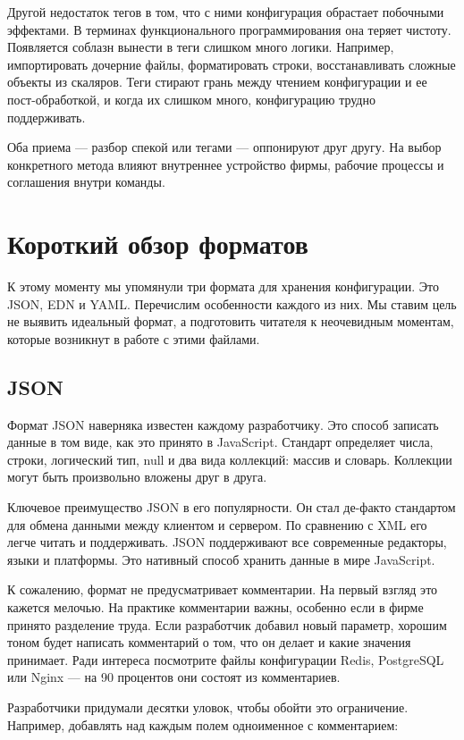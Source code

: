 Другой недостаток тегов в том, что с ними конфигурация обрастает побочными
эффектами. В терминах функционального программирования она теряет
чистоту. Появляется соблазн вынести в теги слишком много логики. Например,
импортировать дочерние файлы, форматировать строки, восстанавливать сложные
объекты из скаляров. Теги стирают грань между чтением конфигурации и ее
пост-обработкой, и когда их слишком много, конфигурацию трудно поддерживать.

Оба приема — разбор спекой или тегами — оппонируют друг другу. На выбор
конкретного метода влияют внутреннее устройство фирмы, рабочие процессы и
соглашения внутри команды.

\section{Короткий обзор форматов}

К этому моменту мы упомянули три формата для хранения конфигурации. Это JSON,
EDN и YAML. Перечислим особенности каждого из них. Мы ставим цель не выявить
идеальный формат, а подготовить читателя к неочевидным моментам, которые
возникнут в работе с этими файлами.

\subsection{JSON}

Формат JSON наверняка известен каждому разработчику. Это способ записать данные
в том виде, как это принято в JavaScript. Стандарт определяет числа, строки,
логический тип, null и два вида коллекций: массив и словарь. Коллекции могут
быть произвольно вложены друг в друга.

Ключевое преимущество JSON в его популярности. Он стал де-факто стандартом для
обмена данными между клиентом и сервером. По сравнению с XML его легче читать и
поддерживать. JSON поддерживают все современные редакторы, языки и
платформы. Это нативный способ хранить данные в мире JavaScript.

К сожалению, формат не предусматривает комментарии. На первый взгляд это кажется
мелочью. На практике комментарии важны, особенно если в фирме принято разделение
труда. Если разработчик добавил новый параметр, хорошим тоном будет написать
комментарий о том, что он делает и какие значения принимает. Ради интереса
посмотрите файлы конфигурации Redis, PostgreSQL или Nginx — на 90 процентов они
состоят из комментариев.

Разработчики придумали десятки уловок, чтобы обойти это ограничение. Например,
добавлять над каждым полем одноименное с комментарием:

